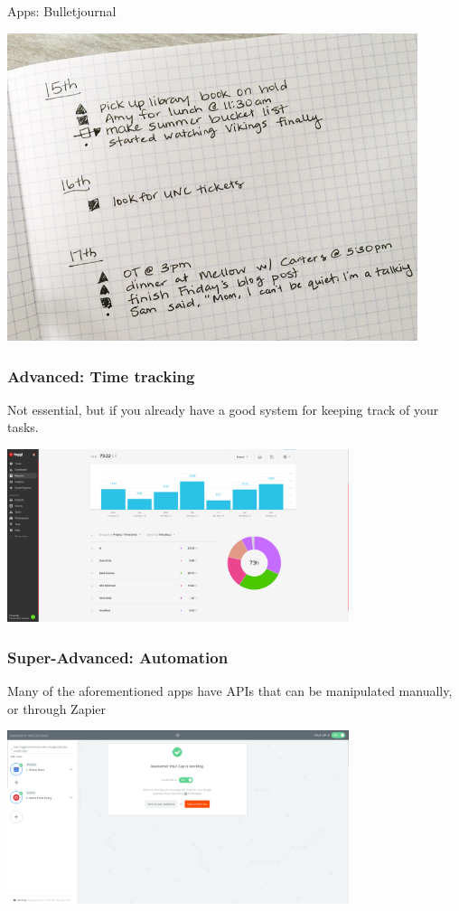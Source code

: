 \documentclass[10pt]{beamer}
\begin{document}
\begin{frame}[c]{Apps: Bulletjournal}

\centerline{\includegraphics[width=12cm]{figs/bulletjournal.jpeg}}

\end{frame}

\begin{frame}[c]\frametitle{Advanced: Time tracking}

Not essential, but if you already have a good system for keeping track of your tasks.

\centerline{\includegraphics[width=10cm]{figs/toggl.png}}

\end{frame}

\begin{frame}[c]\frametitle{Super-Advanced: Automation}

Many of the aforementioned apps have APIs that can be manipulated manually, or through Zapier

\centerline{\includegraphics[width=10cm]{zapier.png}}

\end{frame}
\end{document}
